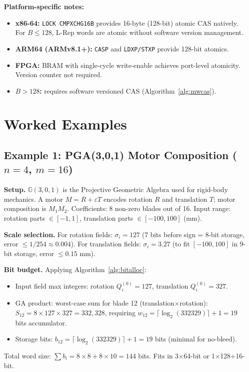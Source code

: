 \documentclass[11pt,a4paper]{article}
\theoremstyle{definition}
\theoremstyle{plain}
\theoremstyle{remark}
\newcommand{\GA}{\mathbb{G}}
\begin{document}
\textbf{Platform-specific notes:}
\begin{itemize}
  \item \textbf{x86-64:} \texttt{LOCK CMPXCHG16B} provides 16-byte (128-bit) atomic CAS natively.  For $B\le 128$, L-Rep words are atomic without software version management.
  \item \textbf{ARM64 (ARMv8.1+):} \texttt{CASP} and \texttt{LDXP/STXP} provide 128-bit atomics.
  \item \textbf{FPGA:} BRAM with single-cycle write-enable achieves port-level atomicity.  Version counter not required.
  \item \textbf{$B > 128$:} requires software versioned CAS (Algorithm~\ref{alg:mwcas}).
\end{itemize}

\section{Worked Examples}
\label{sec:examples}

\subsection{Example 1: PGA(3,0,1) Motor Composition ($n=4$, $m=16$)}

\textbf{Setup.}  $\GA(3,0,1)$ is the Projective Geometric Algebra used for rigid-body mechanics.  A motor $M = R + \varepsilon T$ encodes rotation $R$ and translation $T$; motor composition is $M_1 M_2$.  Coefficients: 8 non-zero blades out of 16.  Input range: rotation parts $\in[-1,1]$, translation parts $\in[-100,100]$ (mm).

\textbf{Scale selection.}  For rotation fields: $\sigma_i = 127$ (7 bits before sign = 8-bit storage, error $\le 1/254 \approx 0.004$).  For translation fields: $\sigma_i = 3.27$ (to fit $[-100,100]$ in 9-bit storage, error $\le 0.15$ mm).

\textbf{Bit budget.}  Applying Algorithm~\ref{alg:bitalloc}:
\begin{itemize}
  \item Input field max integers: rotation $Q_i^{(0)} = 127$, translation $Q_i^{(0)} = 327$.
  \item GA product: worst-case sum for blade 12 (translation$\times$rotation): $S_{12} = 8\times 127\times 327 = 332,328$, requiring $w_{12} = \lceil\log_2(332329)\rceil+1 = 19$ bits accumulator.
  \item Storage bits: $b_{12} = \lceil\log_2(332329)\rceil+1 = 19$ bits (minimal for no-bleed).
\end{itemize}
Total word size: $\sum b_i = 8\times 8 + 8\times 10 = 144$ bits.  Fits in 3$\times$64-bit or 1$\times$128+16-bit.
\end{document}

